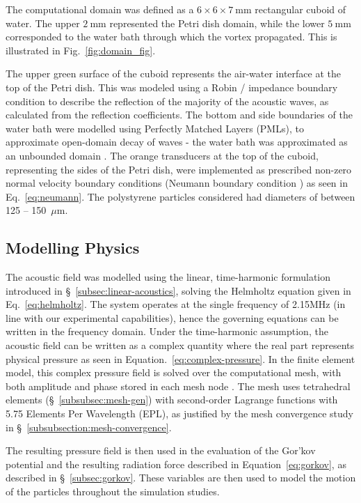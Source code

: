 \documentclass[11pt,a4paper]{article}
\begin{document}
The computational domain was defined as a $6 \times 6 \times 7~\mathrm{mm}$ rectangular cuboid of water. The upper $2~\mathrm{mm}$ represented the Petri dish domain, while the lower $5~\mathrm{mm}$ corresponded to the water bath through which the vortex propagated. This is illustrated in Fig.~\ref{fig:domain_fig}.


\noindent The upper green surface of the cuboid represents the air-water interface at the top of the Petri dish. This was modeled using a Robin / impedance boundary condition to describe the reflection of the majority of the acoustic waves, as calculated from the reflection coefficients. The bottom and side boundaries of the water bath were modelled using Perfectly Matched Layers (PMLs), to approximate open-domain decay of waves - the water bath was approximated as an unbounded domain \cite{cimpeanu2015pml}. The orange transducers at the top of the cuboid, representing the sides of the Petri dish, were implemented as prescribed non-zero normal velocity boundary conditions (Neumann boundary condition \cite{ihlenburg1998finite}) as seen in Eq.~\ref{eq:neumann}. The polystyrene particles considered had diameters of between 125 -- 150~$\mu\text{m}$. 


\subsection{Modelling Physics}
\label{subsubsec:modelling-physics}

The acoustic field was modelled using the linear, time-harmonic formulation introduced in \S~\ref{subsec:linear-acoustics}, solving the Helmholtz equation given in Eq.~\ref{eq:helmholtz}. The system operates at the single frequency of 2.15MHz (in line with our experimental capabilities), hence the governing equations can be written in the frequency domain. Under the time-harmonic assumption, the acoustic field can be written as a complex quantity where the real part represents physical pressure as seen in Equation.~\ref{eq:complex-pressure}. In the finite element model, this complex pressure  field is solved over the computational mesh, with both amplitude and phase stored in each mesh node \cite{kinsler2000acoustics, ihlenburg1998finite}. The mesh uses tetrahedral elements (\S~\ref{subsubsec:mesh-gen}) with second-order Lagrange functions with 5.75 Elements Per Wavelength (EPL), as justified by the mesh convergence study in \S~\ref{subsubsection:mesh-convergence}.

The resulting pressure field is then used in the evaluation of the Gor'kov potential and the resulting radiation force described in Equation~\ref{eq:gorkov}, as described in \S~\ref{subsec:gorkov}. These variables are then used to model the motion of the particles throughout the simulation studies. 
\\
\end{document}
